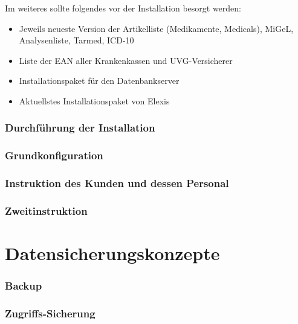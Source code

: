 \documentclass[paper=a4,BCOR8.25mm,twoside]{scrartcl}
\begin{document}
Im weiteres sollte folgendes vor der Installation besorgt werden:
\begin{itemize}
    \item Jeweils neueste Version der Artikelliste (Medikamente, Medicals), MiGeL,  Analysenliste, Tarmed, ICD-10
    \item Liste der EAN aller Krankenkassen und UVG-Versicherer
    \item Installationspaket für den Datenbankserver
    \item Aktuellstes Installationspaket von Elexis

\end{itemize}

\section{Durchführung der Installation}
\label{ablauf}


\section{Grundkonfiguration}
\label{config}

\section{Instruktion des Kunden und dessen Personal}

\section{Zweitinstruktion}

\part{Datensicherungskonzepte}
\section{Backup}
\label{backup}

\section{Zugriffs-Sicherung}
\label{security}
\end{document}
